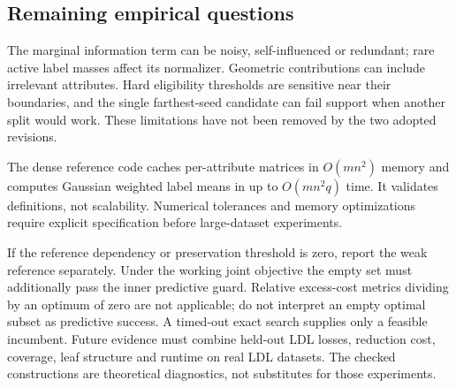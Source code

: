 \subsection{Remaining empirical questions}
The marginal information term can be noisy, self-influenced or redundant;
rare active label masses affect its normalizer. Geometric contributions
can include irrelevant attributes. Hard eligibility thresholds are
sensitive near their boundaries, and the single farthest-seed candidate
can fail support when another split would work. These limitations have
not been removed by the two adopted revisions.

The dense reference code caches per-attribute matrices in $O(mn^2)$
memory and computes Gaussian weighted label means in up to
$O(mn^2q)$ time. It validates definitions, not scalability. Numerical
tolerances and memory optimizations require explicit specification before
large-dataset experiments.

If the reference dependency or preservation threshold is zero, report
the weak reference separately. Under the working joint objective the
empty set must additionally pass the inner predictive guard. Relative excess-cost metrics dividing by an
optimum of zero are not applicable; do not interpret an empty optimal
subset as predictive success. A timed-out exact search supplies only a
feasible incumbent. Future evidence must combine held-out LDL losses,
reduction cost, coverage, leaf structure and runtime on real LDL datasets.
The checked constructions are theoretical diagnostics, not substitutes
for those experiments.
